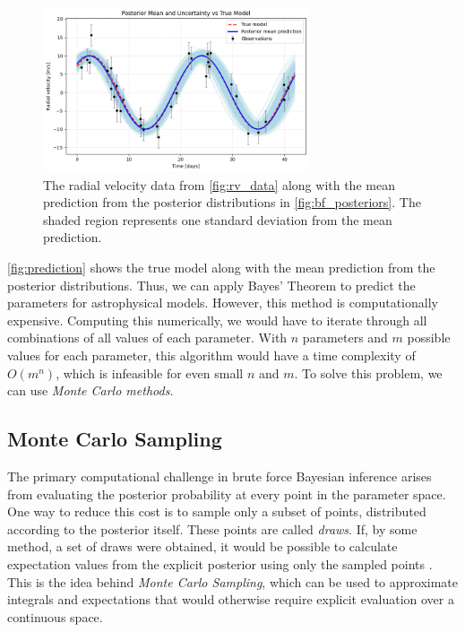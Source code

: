 \documentclass[preprint,longauthor]{aastex631}
\numberwithin{equation}{section}
\begin{document}
\begin{figure}[ht!]
\centering
\includegraphics[width=0.7\textwidth]{../scripts/2.2/figures/prediction.png}
\caption{The radial velocity data from \autoref{fig:rv_data} along with the mean prediction from the posterior distributions in \autoref{fig:bf_posteriors}. The shaded region represents one standard deviation from the mean prediction.}
\label{fig:prediction}
\end{figure}

\autoref{fig:prediction} shows the true model along with the mean prediction from the posterior distributions. Thus, we can apply Bayes' Theorem to predict the parameters for astrophysical models. However, this method is computationally expensive. Computing this numerically, we would have to iterate through all combinations of all values of each parameter. With $n$ parameters and $m$ possible values for each parameter, this algorithm would have a time complexity of $O(m^n)$, which is infeasible for even small $n$ and $m$. To solve this problem, we can use \textit{Monte Carlo methods}.

\subsection{Monte Carlo Sampling}
The primary computational challenge in brute force Bayesian inference arises from evaluating the posterior probability at every point in the parameter space. One way to reduce this cost is to sample only a subset of points, distributed according to the posterior itself. These points are called \textit{draws}. If, by some method, a set of draws were obtained, it would be possible to calculate expectation values from the explicit posterior using only the sampled points \citep{vontoussaintBayesianInferencePhysics2011}. This is the idea behind \textit{Monte Carlo Sampling}, which can be used to approximate integrals and expectations that would otherwise require explicit evaluation over a continuous space.
\end{document}
